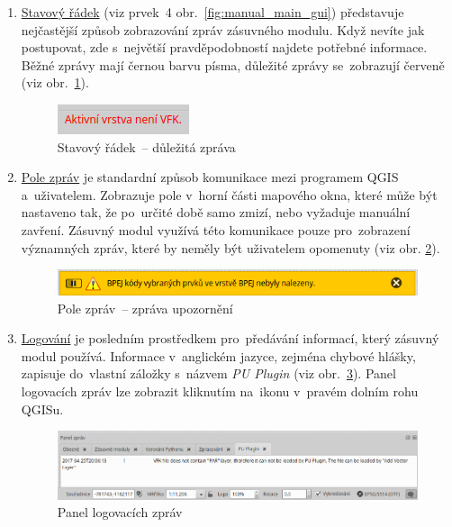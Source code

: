 \begin{enumerate}[leftmargin=1.5cm, noitemsep]
	\item \underline{Stavový řádek} (viz prvek~4 obr.~\ref{fig:manual_main_gui}) představuje nejčastější způsob zobrazování zpráv zásuvného modulu. Když nevíte jak postupovat, zde s~největší pravděpodobností najdete potřebné informace. Běžné zprávy mají černou barvu písma, důležité zprávy se~zobrazují červeně (viz obr.~\ref{fig:manual_dulezita_zprava}).
	
	\begin{figure}[H]
		\centering
		\includegraphics[width=.23\textwidth]{./pictures/statusbar-red_message.png}
		\caption[Stavový řádek~– důležitá zpráva]{Stavový řádek~– důležitá zpráva}
		\label{fig:manual_dulezita_zprava}
 	\end{figure}	

	\item \underline{Pole zpráv} je standardní způsob komunikace mezi programem QGIS a~uživatelem. Zobrazuje pole v~horní části mapového okna, které může být nastaveno tak, že po~určité době samo zmizí, nebo vyžaduje manuální zavření. Zásuvný modul využívá této komunikace pouze pro~zobrazení významných zpráv, které by neměly být uživatelem opomenuty (viz obr. \ref{fig:manual_zprava_pole_zprav}).

	\begin{figure}[H]
		\centering
		\includegraphics[width=.7\textwidth]{./pictures/message_bar-message.png}
		\caption[Pole zpráv~– zpráva upozornění]{Pole zpráv~– zpráva upozornění}
		\label{fig:manual_zprava_pole_zprav}
 	\end{figure}

	\item \underline{Logování} je posledním prostředkem pro~předávání informací, který zásuvný modul používá. Informace v~anglickém jazyce, zejména chybové hlášky, zapisuje do~vlastní záložky s~názvem \textit{PU Plugin} (viz obr.~\ref{fig:manual_logovaci_panel}). Panel logovacích zpráv lze zobrazit kliknutím na~ikonu  v~pravém dolním rohu QGISu.

	\begin{figure}[H]
		\centering
		\includegraphics[width=1.0\textwidth]{./pictures/log_panel.png}
		\caption[Panel logovacích zpráv]{Panel logovacích zpráv}
		\label{fig:manual_logovaci_panel}
 	\end{figure}

\end{enumerate}

